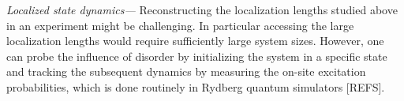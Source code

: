 \documentclass[prl,aps,twocolumn,showpacs,superscriptaddress,longbibliography]{revtex4-1}
\begin{document}
















%
\emph{Localized state dynamics---}
Reconstructing the localization lengths studied above in an experiment might be challenging. In particular accessing the large localization lengths would require sufficiently large system sizes. However, one can probe the influence of disorder by initializing the system in a specific state and tracking the subsequent dynamics by measuring the on-site excitation probabilities, which is done routinely in Rydberg quantum simulators [REFS].
\end{document}
